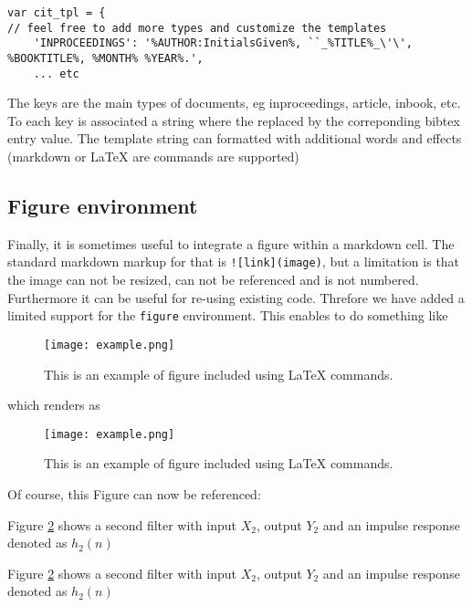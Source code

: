 \begin{verbatim}
var cit_tpl = {
// feel free to add more types and customize the templates
    'INPROCEEDINGS': '%AUTHOR:InitialsGiven%, ``_%TITLE%_\'\', %BOOKTITLE%, %MONTH% %YEAR%.',
    ... etc
\end{verbatim}

The keys are the main types of documents, eg inproceedings, article,
inbook, etc. To each key is associated a string where the
replaced by the correponding bibtex entry value. The template string can
formatted with additional words and effects (markdown or LaTeX are
commands are supported)

    \subsection{Figure environment}\label{figure-environment}

    Finally, it is sometimes useful to integrate a figure within a markdown
cell. The standard markdown markup for that is
\texttt{!{[}link{]}(image)}, but a limitation is that the image can not
be resized, can not be referenced and is not numbered. Furthermore it
can be useful for re-using existing code. Threfore we have added a
limited support for the \texttt{figure} environment. This enables to do
something like

\begin{listing}
\begin{figure}
\centerline{\texttt{[image: example.png]}}
\caption{\label{fig:example} This is an example of figure included using LaTeX commands.}
\end{figure}
\end{listing}

which renders as

\begin{figure}
\centerline{\texttt{[image: example.png]}}
\caption{\label{fig:example} This is an example of figure included using LaTeX commands.}
\end{figure}

Of course, this Figure can now be referenced:

\begin{listing}
Figure \ref{fig:example} shows a second filter with input $X_2$, output $Y_2$  and an impulse response denoted as $h_2(n)$
\end{listing}

Figure \ref{fig:example} shows a second filter with input \(X_2\),
output \(Y_2\) and an impulse response denoted as \(h_2(n)\)

